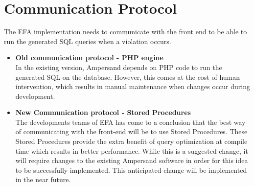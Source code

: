\section{Communication Protocol}
The EFA implementation needs to communicate with the front end to be able to 
run the generated SQL queries when a violation occurs. 
\begin{itemize}
    \item \textbf{Old communication protocol -  PHP engine} \\
    In the existing version, Ampersand depends on PHP code to run the 
    generated SQL on the database. However, this comes at the cost of 
    human intervention, which results in manual maintenance when 
    changes occur during development. 
    \item \textbf{New Communication protocol - Stored Procedures} \\
    The developments teams of EFA has come to a conclusion that the 
    best way of communicating with the front-end will be to use Stored 
    Procedures\cite{SP}. These Stored Procedures provide the extra 
    benefit of query optimization at compile time which results in 
    better performance. While this is a suggested change, it will 
    require changes to the existing Ampersand software in order for 
    this idea to be successfully implemented. This anticipated 
    change will be implemented in the near future.
    
\end{itemize}
